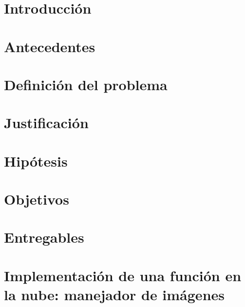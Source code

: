 \documentclass[12pt, twoside]{report}
\begin{document}
\tableofcontents
\listoffigures
\listoftables

\printglossary[type=\acronymtype, title=Acrónimos]

\printglossaries

\chapter{Introducción}


\chapter{Antecedentes}
\label{cap:antecedentes}


\chapter{Definición del problema}
\label{cap:problema}


\chapter{Justificación}
\label{cap:justificacion}


\chapter{Hipótesis}
\label{cap:hipotesis}


\chapter{Objetivos}
\label{cap:objetivos}


\chapter{Entregables}
\label{cap:entregables}


\chapter[Implementación de una \emph{FaaS}: manejador de imágnenes]{Implementación de una función en la nube: manejador de imágenes}
\label{cap:manejador-imagenes}


%
%
%
\end{document}

